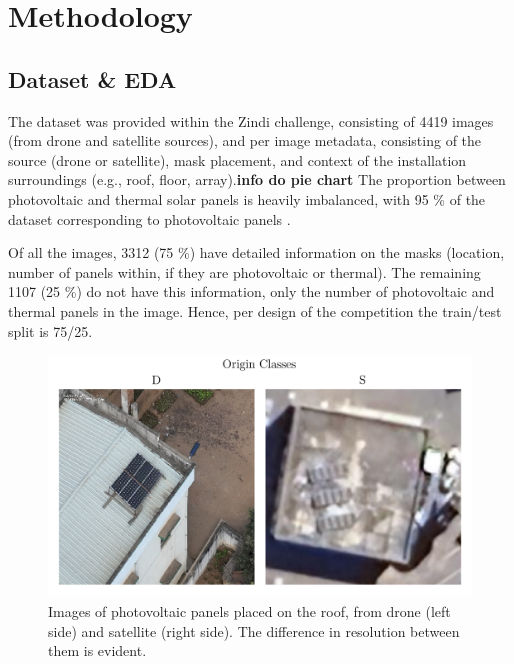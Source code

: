 \documentclass[conference]{IEEEtran}
\begin{document}
\section{Methodology}

\subsection{Dataset \& EDA}

The dataset was provided within the Zindi challenge, consisting of 4419 images (from drone and satellite sources), and per image metadata, consisting of the source (drone or satellite), mask placement, and context of the installation surroundings (e.g., roof, floor, array).\textbf{info do pie chart} The proportion between photovoltaic and thermal solar panels is heavily imbalanced, with 95 \% of the dataset corresponding to photovoltaic panels \cite{zindi2025lacuna}.

Of all the images, 3312 (75 \%) have detailed information on the masks (location, number of panels within, if they are photovoltaic or thermal). The remaining 1107 (25 \%) do not have this information, only the number of photovoltaic and thermal panels in the image. Hence, per design of the competition the train/test split is 75/25.

\begin{figure}[H]
    \centering
    \includegraphics[width=1\linewidth]{assets/data_origin_classes.png}
    \caption{Images of photovoltaic panels placed on the roof, from drone (left side) and satellite (right side). The difference in resolution between them is evident.}
    \label{fig:data_origin_classes}
\end{figure}
\end{document}
